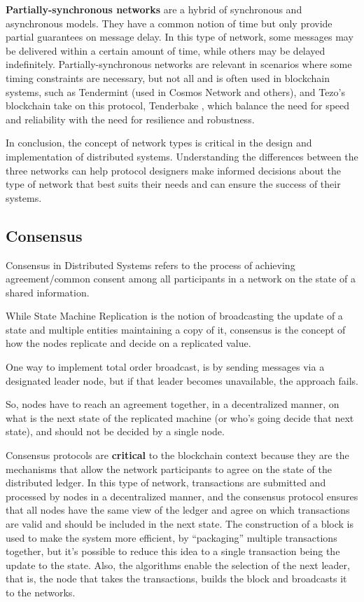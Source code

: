 \textbf{Partially-synchronous networks} \cite{dwork1988consensus} are a hybrid of synchronous and asynchronous models.
They have a common notion of time but only provide partial guarantees on message delay. In this type of network, some messages may be delivered within a certain amount of time, while others may be delayed indefinitely. Partially-synchronous networks are relevant in scenarios where some timing constraints are necessary, but not all and is often used in blockchain systems, such as Tendermint \cite{buchman2016tendermint}(used in Cosmos Network\cite{tendermintinc} and others), and Tezo's blockchain take on this protocol, Tenderbake \cite{acstefanoaei2020tenderbake}, which balance the need for speed and reliability with the need for resilience and robustness.

In conclusion, the concept of network types is critical in the design and implementation of distributed systems. Understanding the differences between the three networks can help protocol designers make informed decisions about the type of network that best suits their needs and can ensure the success of their systems.

\subsection*{\textbf{Consensus}}
Consensus in Distributed Systems refers to the process of achieving agreement/common consent among all participants in a network on the state of a shared information.

While State Machine Replication is the notion of broadcasting the update of a state and multiple entities maintaining a copy of it, consensus is the concept of how the nodes replicate and decide on a replicated value.

One way to implement total order broadcast, is by sending messages via a designated leader node, but if that leader becomes unavailable, the approach fails. 

So, nodes have to reach an agreement together, in a decentralized manner, on what is the next state of the replicated machine (or who's going decide that next state), and should not be decided by a single node.

Consensus protocols are \textbf{critical} to the blockchain context because they are the mechanisms that allow the network participants to agree on the state of the distributed ledger. In this type of network, transactions are submitted and processed by nodes in a decentralized manner, and the consensus protocol ensures that all nodes have the same view of the ledger and agree on which transactions are valid and should be included in the next state.
The construction of a block is used to make the system more efficient, by ``packaging'' multiple transactions together, but it's possible to reduce this idea to a single transaction being the update to the state.
Also, the algorithms enable the selection of the next leader, that is, the node that takes the transactions, builds the block and broadcasts it to the networks. 

